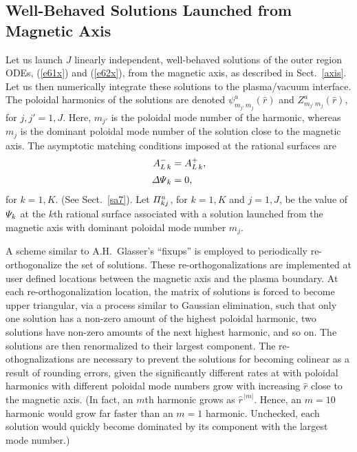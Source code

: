 \documentclass[12pt,prb,aps]{revtex4-1}
\begin{document}
\subsection{Well-Behaved Solutions Launched from Magnetic Axis}
Let us launch $J$ linearly independent, well-behaved solutions of the outer region ODEs, (\ref{e61x}) and (\ref{e62x}), from the
magnetic axis, as described in Sect.~\ref{axis}. Let us then numerically integrate these solutions to the plasma/vacuum interface. The poloidal harmonics of
the solutions are denoted $\psi^a_{m_{j'}\,m_j}(\hat{r})$ and $Z^a_{m_{j'}\,m_j}(\hat{r})$, for $j,j'=1,J$. Here,
$m_{j'}$ is the poloidal mode number of the harmonic, whereas $m_j$ is the dominant poloidal mode number of the solution close to the
magnetic axis. The asymptotic matching conditions imposed at the rational surfaces are
\begin{align}
A_{L\,k}^{-} &= A_{L\,k}^+,\\[0.5ex]
{\mit\Delta\Psi}_k &= 0,
\end{align}
for $k=1,K$. (See Sect.~\ref{sa7}). 
Let ${\mit\Pi}_{kj}^a$, for   $k=1,K$ and $j=1,J$,  be the value of ${\mit\Psi}_k$ at the $k$th rational surface associated with a solution launched
from the magnetic axis with dominant poloidal mode number $m_j$. 

A scheme similar to A.H.~Glasser's ``fixups'' \cite{ham} is employed to periodically re-orthogonalize the set of solutions. These  re-orthogonalizations are implemented at user defined locations between the magnetic axis and the plasma boundary.  At each re-orthogonalization location, the matrix of solutions is forced to become upper triangular, via a process similar to Gaussian elimination, such that only one solution has a non-zero amount of the highest poloidal  harmonic, two solutions have non-zero amounts of the next highest harmonic, and so on. The solutions are then renormalized to their largest component. 
 The re-othognalizations are
 necessary to prevent the solutions for becoming colinear as a result of rounding errors, given the significantly
 different rates at with poloidal harmonics with different poloidal mode numbers grow with increasing $\hat{r}$  close to the magnetic axis. (In fact, an $m$th harmonic grows as $\hat{r}^{\,|m|}$. Hence, an $m=10$ harmonic would grow far faster than an $m=1$ harmonic. Unchecked, each solution
 would quickly become dominated by its component with the largest mode number.)
\end{document}

